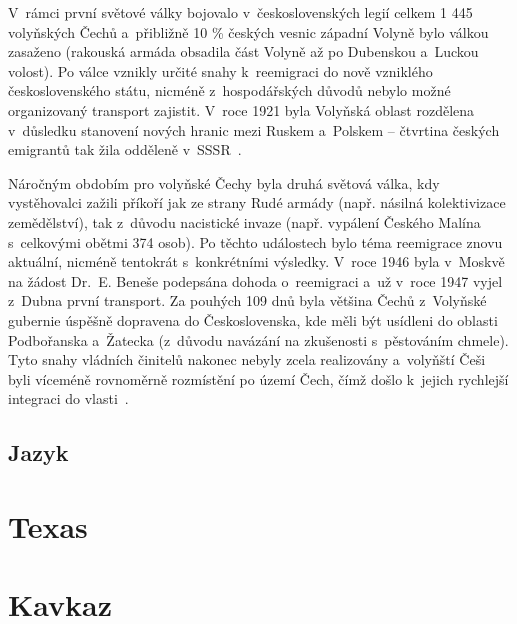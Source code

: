 V~rámci první světové války bojovalo v~československých legií celkem 1 445 volyňských Čechů a~přibližně 10 \% českých vesnic západní Volyně bylo válkou zasaženo (rakouská armáda obsadila část Volyně až po Dubenskou a~Luckou volost). Po válce vznikly určité snahy k~reemigraci do nově vzniklého československého státu, nicméně z~hospodářských důvodů nebylo možné organizovaný transport zajistit. V~roce 1921 byla Volyňská oblast rozdělena v~důsledku stanovení nových hranic mezi Ruskem a~Polskem -- čtvrtina českých emigrantů tak žila odděleně v~SSSR~\parencite{Hofman2020}.

Náročným obdobím pro volyňské Čechy byla druhá světová válka, kdy vystěhovalci zažili příkoří jak ze strany Rudé armády (např. násilná kolektivizace zemědělství), tak z~důvodu nacistické invaze (např. vypálení Českého Malína s~celkovými obětmi 374 osob). Po těchto událostech bylo téma reemigrace znovu aktuální, nicméně tentokrát s~konkrétními výsledky. V~roce 1946 byla v~Moskvě na žádost Dr.~E. Beneše podepsána dohoda o~reemigraci a~už v~roce 1947 vyjel z~Dubna první transport. Za pouhých 109 dnů byla většina Čechů z~Volyňské gubernie úspěšně dopravena do Československa, kde měli být usídleni do oblasti Podbořanska a~Žatecka (z~důvodu navázání na zkušenosti s~pěstováním chmele). Tyto snahy vládních činitelů nakonec nebyly zcela realizovány a~volyňští Češi byli víceméně rovnoměrně rozmístění po území Čech, čímž došlo k~jejich rychlejší integraci do vlasti~\parencite{Hofman2020}.

\hypertarget{jazyk-1}{%
\subsection*{Jazyk}\label{jazyk-1}}

\hypertarget{texas}{%
\section{Texas}\label{texas}}

\hypertarget{kavkaz}{%
\section{Kavkaz}\label{kavkaz}}
